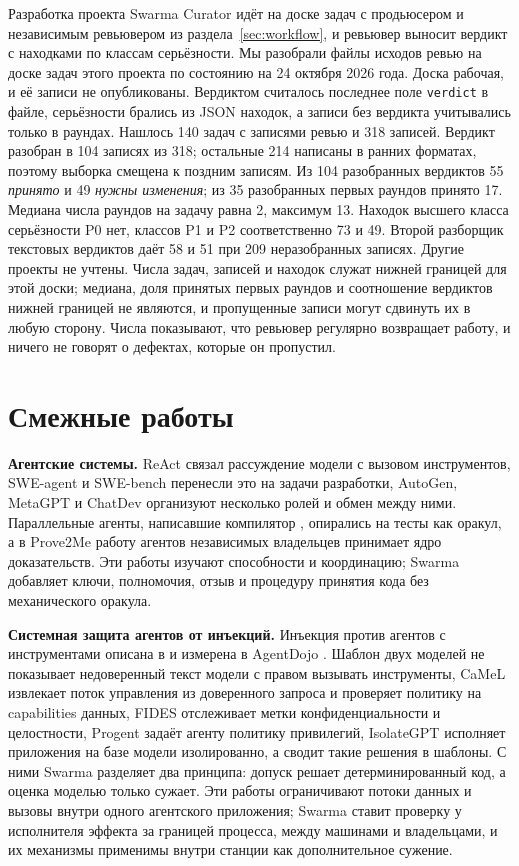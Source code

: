 \documentclass[10pt,a4paper]{article}
\newcommand{\measured}[1]{#1}
\begin{document}
Разработка проекта Swarma Curator идёт на доске задач с продьюсером и независимым ревьювером из раздела~\ref{sec:workflow}, и ревьювер выносит вердикт с находками по классам серьёзности. Мы разобрали файлы исходов ревью на доске задач этого проекта по состоянию на 24 октября 2026 года. Доска рабочая, и её записи \measured{не опубликованы}. Вердиктом считалось последнее поле \texttt{verdict} в файле, серьёзности брались из JSON находок, а записи без вердикта учитывались только в раундах. Нашлось 140 задач с записями ревью и 318 записей. Вердикт разобран в 104 записях из 318; остальные 214 написаны в ранних форматах, поэтому выборка смещена к поздним записям. Из 104 разобранных вердиктов 55 \emph{принято} и 49 \emph{нужны изменения}; из 35 разобранных первых раундов принято 17. Медиана числа раундов на задачу равна 2, максимум 13. Находок высшего класса серьёзности P0 нет, классов P1 и P2 соответственно 73 и 49. Второй разборщик текстовых вердиктов даёт 58 и 51 при 209 неразобранных записях. Другие проекты не учтены. Числа задач, записей и находок служат нижней границей для этой доски; медиана, доля принятых первых раундов и соотношение вердиктов нижней границей не являются, и пропущенные записи могут сдвинуть их в любую сторону. Числа показывают, что ревьювер регулярно возвращает работу, и ничего не говорят о дефектах, которые он пропустил.

\section{Смежные работы}
\label{sec:related}

\textbf{Агентские системы.} ReAct \cite{react} связал рассуждение модели с вызовом инструментов, SWE-agent \cite{sweagent} и SWE-bench \cite{swebench} перенесли это на задачи разработки, AutoGen, MetaGPT и ChatDev \cite{autogen,metagpt,chatdev} организуют несколько ролей и обмен между ними. Параллельные агенты, написавшие компилятор \cite{compiler}, опирались на тесты как оракул, а в Prove2Me \cite{prove2me} работу агентов независимых владельцев принимает ядро доказательств. Эти работы изучают способности и координацию; Swarma добавляет ключи, полномочия, отзыв и процедуру принятия кода без механического оракула.

\textbf{Системная защита агентов от инъекций.} Инъекция против агентов с инструментами описана в \cite{greshake} и измерена в AgentDojo \cite{agentdojo}. Шаблон двух моделей \cite{duallm} не показывает недоверенный текст модели с правом вызывать инструменты, CaMeL \cite{camel} извлекает поток управления из доверенного запроса и проверяет политику на capabilities данных, FIDES \cite{fides} отслеживает метки конфиденциальности и целостности, Progent \cite{progent} задаёт агенту политику привилегий, IsolateGPT \cite{isolategpt} исполняет приложения на базе модели изолированно, а \cite{designpatterns} сводит такие решения в шаблоны. С ними Swarma разделяет два принципа: допуск решает детерминированный код, а оценка моделью только сужает. Эти работы ограничивают потоки данных и вызовы внутри одного агентского приложения; Swarma ставит проверку у исполнителя эффекта за границей процесса, между машинами и владельцами, и их механизмы применимы внутри станции как дополнительное сужение.
\end{document}
